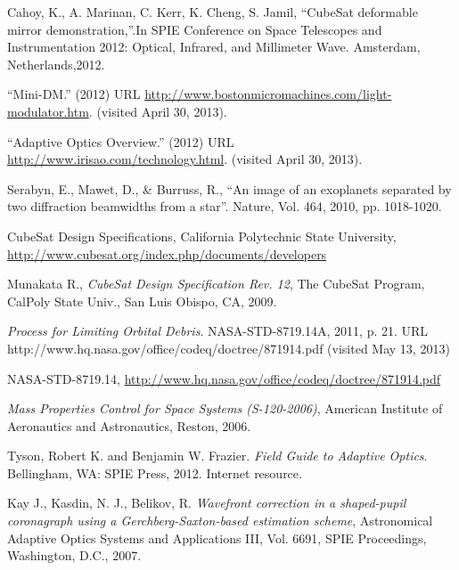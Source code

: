 \documentclass[12pt]{article}
\begin{document}
\begin{thebibliography}{99}





Cahoy, K., A. Marinan, C. Kerr, K. Cheng, S. Jamil, ``CubeSat deformable mirror demonstration,''.In SPIE Conference on Space Telescopes and Instrumentation 2012: Optical, Infrared, and Millimeter Wave. Amsterdam, Netherlands,2012.

``Mini-DM.'' (2012) URL \url{http://www.bostonmicromachines.com/light-modulator.htm}. (visited April 30, 2013).

``Adaptive Optics Overview.'' (2012) URL \url{http://www.irisao.com/technology.html}. (visited April 30, 2013).

Serabyn, E., Mawet, D., \& Burruss, R., ``An image of an exoplanets separated by two diffraction beamwidths from a star''. Nature, Vol. 464, 2010, pp. 1018-1020.

CubeSat Design Specifications, California Polytechnic State University, \url{http://www.cubesat.org/index.php/documents/developers}

Munakata R., \emph{CubeSat Design Specification Rev. 12}, The CubeSat Program, CalPoly State Univ., San Luis Obispo, CA, 2009.

\emph{Process for Limiting Orbital Debris}. NASA-STD-8719.14A, 2011, p. 21. URL http://www.hq.nasa.gov/office/codeq/doctree/871914.pdf (visited May 13, 2013)

NASA-STD-8719.14, \url{http://www.hq.nasa.gov/office/codeq/doctree/871914.pdf}

\emph{Mass Properties Control for Space Systems (S-120-2006)}, American Institute of Aeronautics and Astronautics, Reston, 2006.


   Tyson, Robert K. and Benjamin W. Frazier. 
   \emph{Field Guide to Adaptive Optics}. Bellingham, WA: SPIE Press,
   2012.  Internet resource.

   Kay J., Kasdin, N. J., Belikov, R.
   \emph{Wavefront correction in a shaped-pupil coronagraph using a Gerchberg-Saxton-based estimation scheme}, Astronomical Adaptive Optics Systems and Applications III, Vol. 6691, SPIE Proceedings, Washington, D.C., 2007.


\end{thebibliography}
\end{document}
